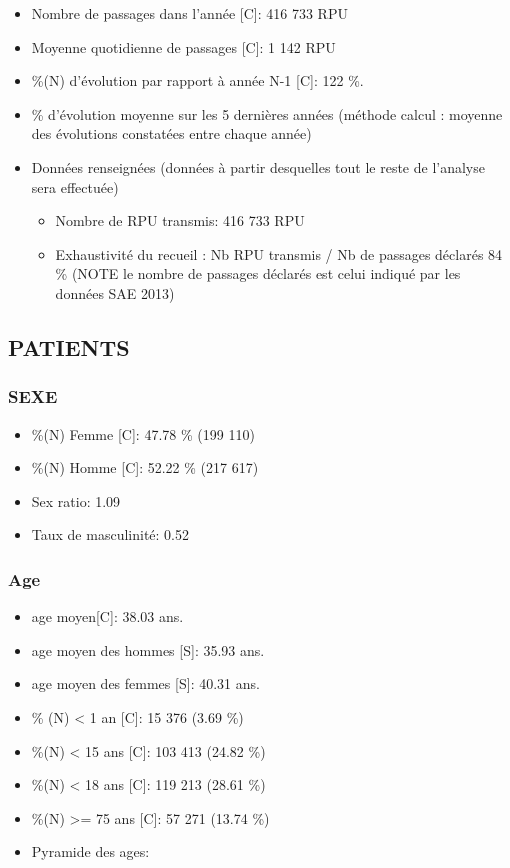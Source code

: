 \documentclass[]{article}
\begin{document}
\begin{itemize}
\itemsep1pt\parskip0pt
\item
  Nombre de passages dans l'année {[}C{]}: 416 733 RPU
\item
  Moyenne quotidienne de passages {[}C{]}: 1 142 RPU
\item
  \%(N) d'évolution par rapport à année N-1 {[}C{]}: 122 \%.
\item
  \% d'évolution moyenne sur les 5 dernières années (méthode calcul :
  moyenne des évolutions constatées entre chaque année)
\item
  Données renseignées (données à partir desquelles tout le reste de
  l'analyse sera effectuée)

  \begin{itemize}
  \itemsep1pt\parskip0pt
  \item
    Nombre de RPU transmis: 416 733 RPU
  \item
    Exhaustivité du recueil : Nb RPU transmis / Nb de passages déclarés
    84 \% (NOTE le nombre de passages déclarés est celui indiqué par les
    données SAE 2013)
  \end{itemize}
\end{itemize}

\subsection{PATIENTS}\label{patients}

\subsubsection{SEXE}\label{sexe}

\begin{itemize}
\itemsep1pt\parskip0pt
\item
  \%(N) Femme {[}C{]}: 47.78 \% (199 110)
\item
  \%(N) Homme {[}C{]}: 52.22 \% (217 617)
\item
  Sex ratio: 1.09
\item
  Taux de masculinité: 0.52
\end{itemize}

\subsubsection{Age}\label{age}

\begin{itemize}
\item
  age moyen{[}C{]}: 38.03 ans.
\item
  age moyen des hommes {[}S{]}: 35.93 ans.
\item
  age moyen des femmes {[}S{]}: 40.31 ans.
\item
  \% (N) \textless{} 1 an {[}C{]}: 15 376 (3.69 \%)
\item
  \%(N) \textless{} 15 ans {[}C{]}: 103 413 (24.82 \%)
\item
  \%(N) \textless{} 18 ans {[}C{]}: 119 213 (28.61 \%)
\item
  \%(N) \textgreater{}= 75 ans {[}C{]}: 57 271 (13.74 \%)
\item
  Pyramide des ages:
\end{itemize}
\end{document}
